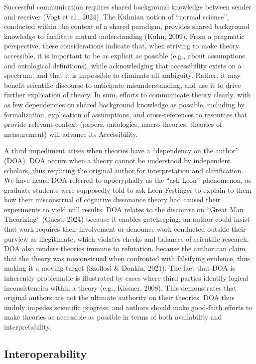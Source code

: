 \documentclass[
  man,floatsintext]{apa6}
\begin{document}
Successful communication requires shared background knowledge between sender and receiver (Vogt et al., 2024).
The Kuhnian notion of ``normal science'', conducted within the context of a shared paradigm, provides shared background knowledge to facilitate mutual understanding (Kuhn, 2009).
From a pragmatic perspective, these considerations indicate that,
when striving to make theory accessible,
it is important to be as explicit as possible (e.g., about assumptions and ontological definitions),
while acknowledging that accessibility exists on a spectrum,
and that it is impossible to eliminate all ambiguity.
Rather, it may benefit scientific discourse to anticipate misunderstanding,
and use it to drive further explication of theory.
In sum, efforts to communicate theory clearly, with as few dependencies on shared background knowledge as possible, including by formalization, explication of assumptions,
and cross-references to resources that provide relevant context (papers, ontologies, macro-theories, theories of measurement)
will advance its Accessibility.

A third impediment arises when theories have a ``dependency on the author'' (DOA).
DOA occurs when a theory cannot be understood by independent scholars,
thus requiring the original author for interpretation and clarification.
We have heard DOA referred to apocryphally as the ``ask Leon'' phenomenon,
as graduate students were supposedly told to ask Leon Festinger to explain to them how their misconstrual of cognitive dissonance theory had caused their experiments to yield null results.
DOA relates to the discourse on ``Great Man Theorizing'' (Guest, 2024) because it enables gatekeeping: an author could insist that work requires their involvement or denounce work conducted outside their purview as illegitimate,
which violates checks and balances of scientific research.
DOA also renders theories immune to refutation,
because the author can claim that the theory was misconstrued when confronted with falsifying evidence, thus making it a moving target (Szollosi \& Donkin, 2021).
The fact that DOA is inherently problematic is illustrated by cases where third parties identify logical inconsistencies within a theory (e.g., Kissner, 2008).
This demonstrates that original authors are not the ultimate authority on their theories.
DOA thus unduly impedes scientific progress, and authors should make good-faith efforts to make theories as accessible as possible in terms of both availability and interpretability.

\subsection{Interoperability}\label{interoperability}
\end{document}
